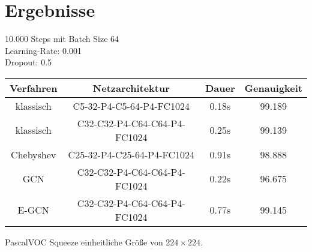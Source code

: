 \section{Ergebnisse}
\label{ergebnisse}

10.000 Steps mit Batch Size 64\\
Learning-Rate: 0.001\\
Dropout: 0.5\\

\begin{tabular}{cccc}
  \toprule
  Verfahren & Netzarchitektur & Dauer & Genauigkeit\\
  \midrule
  klassisch & C5-32-P4-C5-64-P4-FC1024 & 0.18s & 99.189\\
  klassisch & C32-C32-P4-C64-C64-P4-FC1024 & 0.25s & 99.139\\
  Chebyshev & C25-32-P4-C25-64-P4-FC1024 & 0.91s & 98.888\\
  GCN & C32-C32-P4-C64-C64-P4-FC1024 & 0.22s & 96.675\\
  E-GCN & C32-C32-P4-C64-C64-P4-FC1024 & 0.77s & 99.145\\
  \bottomrule
\end{tabular}


PascalVOC Squeeze einheitliche Größe von $224 \times 224$.
